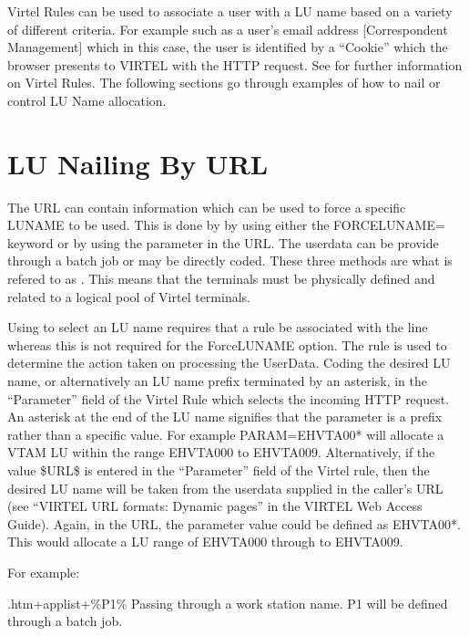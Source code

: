 \documentclass[letterpaper,10pt,english]{sphinxmanual}
\begin{document}
\sphinxAtStartPar
Virtel Rules can be used to associate a user with a LU name based on a variety of different criteria. For example such as a user’s e\sphinxhyphen{}mail address {[}Correspondent Management{]} which in this case, the user is identified by a “Cookie” which the browser presents to VIRTEL with the HTTP request. See {\hyperref[\detokenize{connectivity_guide:v462cn-virtelrules}]{}} for further information on Virtel Rules. The following sections go through examples of how to nail or control LU Name allocation.


\section{LU Nailing By URL}
\label{\detokenize{connectivity_guide:lu-nailing-by-url}}
\sphinxAtStartPar
The URL can contain information which can be used to force a specific LUNAME to be used. This is done by by using either the FORCELUNAME= keyword or by using the  parameter in the URL. The userdata can be provide through a batch job or may be directly coded. These three methods are what is refered to as . This means that the terminals must be physically defined and related to a logical pool of Virtel terminals.

\sphinxAtStartPar
Using  to select an LU name requires that a rule be associated with the line whereas this is not required for the ForceLUNAME option. The rule is used to determine the action taken on processing the UserData. Coding the desired LU name, or alternatively an LU name prefix terminated by an asterisk, in the “Parameter” field of the Virtel Rule which selects the incoming HTTP request. An asterisk at the end of the LU name signifies that the parameter is a prefix rather than a specific value. For example PARAM=EHVTA00* will allocate a VTAM LU within the range EHVTA000 to EHVTA009. Alternatively, if the value \$URL\$ is entered in the “Parameter” field of the Virtel rule, then the desired LU name will be taken from the userdata supplied in the caller’s URL (see “VIRTEL URL formats: Dynamic pages” in the VIRTEL Web Access Guide). Again, in the URL, the parameter value could be defined as EHVTA00*. This would allocate a LU range of EHVTA000 through to EHVTA009.

\sphinxAtStartPar
For example:\sphinxhyphen{}

\sphinxAtStartPar
{}.htm+applist+\%P1\%                Passing through a work station name. P1 will be defined through a batch job.
\end{document}
